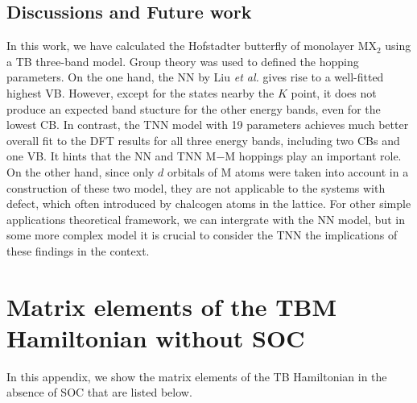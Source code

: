 \documentclass{report}
\begin{document}
\section{Discussions and Future work}
In this work, we have calculated the Hofstadter butterfly of monolayer MX$_2$ using a \ac{TB} three-band model. Group theory was used to defined the hopping parameters. On the one hand, the \ac{NN} by Liu \textit{et al.} gives rise to a well-fitted highest \ac{VB}. However, except for the states nearby the $K$ point, it does not produce an expected band stucture for the other energy bands, even for the lowest \ac{CB}. In contrast, the \ac{TNN} model with 19 parameters achieves much better overall fit to the DFT results for all three energy bands, including two CBs and one VB. It hints that the \ac{NN} and \ac{TNN} M$-$M hoppings play an important role. On the other hand, since only $d$ orbitals of M atoms were taken into account in a construction of these two model, they are not applicable to the systems with defect, which often introduced by chalcogen atoms in the lattice. For other simple applications theoretical framework, we can intergrate with the \ac{NN} model, but in some more complex model it is crucial to consider the \ac{TNN} the implications of these findings in the context.








\appendix
\renewcommand{\chaptername}{Appendix}

\chapter{Matrix elements of the TBM Hamiltonian without SOC} \label{appendix A}

In this appendix, we show the matrix elements of the \ac{TB} Hamiltonian in the absence of \ac{SOC} that are listed below.
\end{document}
